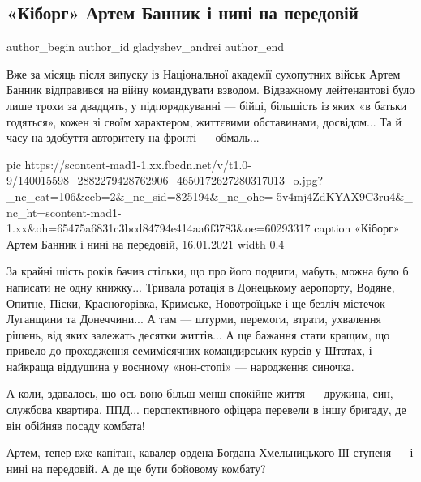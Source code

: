 
 
 
 
 
\subsection{«Кіборг» Артем Банник і нині на передовій}

\ifcmt
  author_begin
   author_id gladyshev_andrei
  author_end
\fi

Вже за місяць після випуску із Національної академії сухопутних військ Артем
Банник відправився на війну командувати взводом. Відважному лейтенантові було
лише трохи за двадцять, у підпорядкуванні — бійці, більшість із яких «в батьки
годяться», кожен зі своїм характером, життєвими обставинами, досвідом... Та й
часу на здобуття авторитету на фронті — обмаль...

\ifcmt
  pic https://scontent-mad1-1.xx.fbcdn.net/v/t1.0-9/140015598_2882279428762906_4650172627280317013_o.jpg?_nc_cat=106&ccb=2&_nc_sid=825194&_nc_ohc=-5v4mj4ZdKYAX9C3ru4&_nc_ht=scontent-mad1-1.xx&oh=65475a6831c3bcd84794e414aa6f3783&oe=60293317
	caption «Кіборг» Артем Банник і нині на передовій, 16.01.2021
  width 0.4
\fi

За крайні шість років бачив стільки, що про його подвиги, мабуть, можна було б
написати не одну книжку... Тривала ротація в Донецькому аеропорту, Водяне,
Опитне, Піски, Красногорівка, Кримське, Новотроїцьке і ще безліч містечок
Луганщини та Донеччини... А там — штурми, перемоги, втрати, ухвалення рішень,
від яких залежать десятки життів... А ще бажання стати кращим, що привело до
проходження семимісячних командирських курсів у Штатах, і найкраща віддушина у
воєнному «нон-стопі» — народження синочка.

А коли, здавалось, що ось воно більш-менш спокійне життя — дружина, син,
службова квартира, ППД... перспективного офіцера перевели в іншу бригаду, де
він обійняв посаду комбата!

Артем, тепер вже капітан, кавалер ордена Богдана Хмельницького ІІІ ступеня — і
нині на передовій. А де ще бути бойовому комбату?

